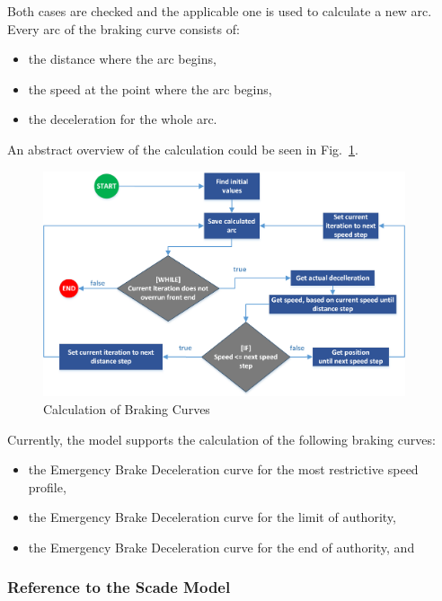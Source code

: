 Both cases are checked and the applicable one is used to calculate a new arc. Every arc of the braking curve consists of:
\begin{itemize}
\item the distance where the arc begins,
\item the speed at the point where the arc begins,
\item the deceleration for the whole arc.
\end{itemize}
An abstract overview of the calculation could be seen in Fig.~\ref{fig:bc_calc}.

\begin{figure}
\centering
\includegraphics[width=0.95\textwidth]{../images/EBD_CalcAlgorithm.png}
\caption{Calculation of Braking Curves}\label{fig:bc_calc}
\end{figure}

Currently, the model supports the calculation of the following braking curves:
\begin{itemize}
	\item the Emergency Brake Deceleration curve for the most restrictive speed profile,
	\item the Emergency Brake Deceleration curve for the limit of authority,
	\item the Emergency Brake Deceleration curve for the end of authority, and
\end{itemize}

\subsubsection{Reference to the Scade Model}

